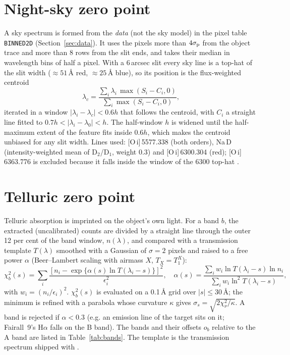 \section{Night-sky zero point}
\label{sec:diag_sky}
A sky spectrum is formed from the \emph{data} (not the sky model) in the pixel table \texttt{BINNED2D}
(Section~\ref{sec:data}). It uses the pixels more than $4\sigma_{\rm p}$ from the object trace and more than 8 rows
from the slit ends, and takes their median in wavelength bins of half a pixel. With a 6\,arcsec slit every sky line is a top-hat of the slit width ($\approx51$\,\AA{} red,
$\approx25$\,\AA{} blue), so its position is the flux-weighted centroid
\begin{equation}
\lambda_c = \frac{\sum_i \lambda_i\, \max(S_i - C_i, 0)}{\sum_i \max(S_i - C_i, 0)},
\label{eq:centroid}
\end{equation}
iterated in a window $|\lambda_i-\lambda_c|<0.6h$ that follows the centroid, with $C_i$ a straight line fitted to
$0.7h<|\lambda_i-\lambda_0|<h$. The half-window $h$ is widened until the half-maximum extent of the feature fits inside
$0.6h$, which makes the centroid unbiased for any slit width. Lines used: [O\,{\sc i}]\,5577.338 (both orders),
Na\,D (intensity-weighted mean of D$_2$/D$_1$, weight 0.3) and [O\,{\sc i}]\,6300.304 (red); [O\,{\sc i}]\,6363.776
is excluded because it falls inside the window of the 6300 top-hat \citep{Osterbrock1996}.

\section{Telluric zero point}
\label{sec:diag_tell}
Telluric absorption is imprinted on the object's own light. For a band $b$, the extracted (uncalibrated) counts are
divided by a straight line through the outer 12 per cent of the band window, $n(\lambda)$, and compared with a
transmission template $T(\lambda)$ smoothed with a Gaussian of $\sigma=2$ pixels and raised to a free power $\alpha$
(Beer--Lambert scaling with airmass $X$, $T_X=T_1^{X}$):
\begin{equation}
\chi^2_b(s) = \sum_i \frac{\left[n_i - \exp\{\alpha(s)\ln T(\lambda_i - s)\}\right]^2}{\epsilon_i^2},\quad
\alpha(s) = \frac{\sum_i w_i \ln T(\lambda_i-s) \ln n_i}{\sum_i w_i \ln^2 T(\lambda_i-s)},
\label{eq:tell}
\end{equation}
with $w_i=(n_i/\epsilon_i)^2$. $\chi^2_b(s)$ is evaluated on a 0.1\,\AA{} grid over $|s|\le30$\,\AA{}; the minimum is
refined with a parabola whose curvature $\kappa$ gives $\sigma_s=\sqrt{2\chi^2_\nu/\kappa}$. A band is rejected if
$\alpha<0.3$ (e.g. an emission line of the target sits on it; Fairall~9's H$\alpha$ falls on the B band).
The bands and their offsets $o_b$ relative to the A band are listed in Table~\ref{tab:bands}. The template is the
transmission spectrum shipped with \banzai{}.
